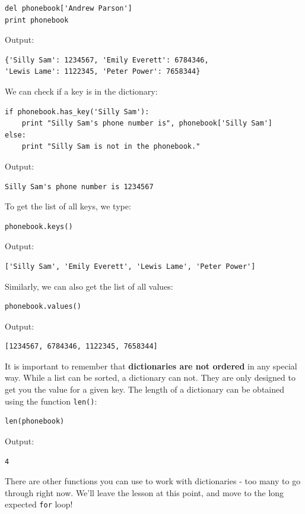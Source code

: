 \documentclass[article,A4,12pt]{llncs}
\begin{document}
\begin{verbatim}
del phonebook['Andrew Parson']
print phonebook
\end{verbatim}
Output:

\begin{verbatim}
{'Silly Sam': 1234567, 'Emily Everett': 6784346, 
'Lewis Lame': 1122345, 'Peter Power': 7658344}
\end{verbatim}
We can check if a key is in the dictionary:

\begin{verbatim}
if phonebook.has_key('Silly Sam'):
    print "Silly Sam's phone number is", phonebook['Silly Sam']
else:
    print "Silly Sam is not in the phonebook."
\end{verbatim}
Output:

\begin{verbatim}
Silly Sam's phone number is 1234567
\end{verbatim}
To get the list of all keys, we type:

\begin{verbatim}
phonebook.keys()
\end{verbatim}
Output:

\begin{verbatim}
['Silly Sam', 'Emily Everett', 'Lewis Lame', 'Peter Power']
\end{verbatim}
Similarly, we can also get the list of all values:

\begin{verbatim}
phonebook.values()
\end{verbatim}
Output:

\begin{verbatim}
[1234567, 6784346, 1122345, 7658344]
\end{verbatim}
It is important to remember that {\bf dictionaries are not ordered} in any 
special way. While a list can be sorted, a dictionary can not. They are only 
designed to get you the value for a given key. 
The length of a dictionary can be obtained using the function {\tt len()}:

\begin{verbatim}
len(phonebook)
\end{verbatim}
Output:

\begin{verbatim}
4
\end{verbatim}
There are other functions you can use to work with dictionaries - too many to go 
through right now. We'll leave the lesson at this point, and move to the long 
expected {\tt for} loop!
\end{document}
